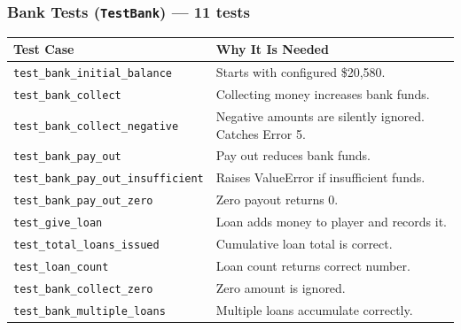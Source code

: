 \documentclass[12pt,a4paper]{article}
\begin{document}
\subsubsection{Bank Tests (\texttt{TestBank}) --- 11 tests}
\begin{longtable}{p{5.8cm} p{6.2cm}}
\toprule
\textbf{Test Case} & \textbf{Why It Is Needed} \\
\midrule
\texttt{test\_bank\_initial\_balance} & Starts with configured \$20,580. \\
\texttt{test\_bank\_collect} & Collecting money increases bank funds. \\
\texttt{test\_bank\_collect\_negative} & Negative amounts are silently ignored. Catches Error 5. \\
\texttt{test\_bank\_pay\_out} & Pay out reduces bank funds. \\
\texttt{test\_bank\_pay\_out\_insufficient} & Raises ValueError if insufficient funds. \\
\texttt{test\_bank\_pay\_out\_zero} & Zero payout returns 0. \\
\texttt{test\_give\_loan} & Loan adds money to player and records it. \\
\texttt{test\_total\_loans\_issued} & Cumulative loan total is correct. \\
\texttt{test\_loan\_count} & Loan count returns correct number. \\
\texttt{test\_bank\_collect\_zero} & Zero amount is ignored. \\
\texttt{test\_bank\_multiple\_loans} & Multiple loans accumulate correctly. \\
\bottomrule
\end{longtable}
\end{document}
